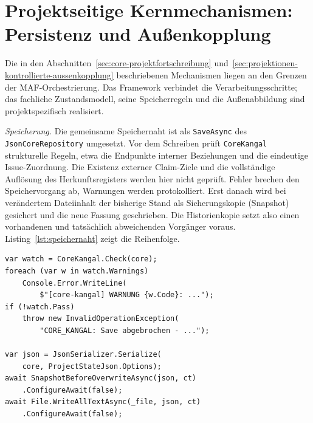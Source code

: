 \section{Projektseitige Kernmechanismen: Persistenz und Außenkopplung}
\label{sec:realisierung-persistenz-aussenkopplung}

Die in den Abschnitten~\ref{sec:core-projektfortschreibung}
und~\ref{sec:projektionen-kontrollierte-aussenkopplung} beschriebenen
Mechanismen liegen an den Grenzen der MAF-Orchestrierung.
Das Framework verbindet die Verarbeitungsschritte; das fachliche
Zustandsmodell, seine Speicherregeln und die Außenabbildung sind
projektspezifisch realisiert.

\emph{Speicherung.} Die gemeinsame Speichernaht ist als
\texttt{SaveAsync} des \texttt{JsonCoreRepository} umgesetzt.
Vor dem Schreiben prüft \texttt{CoreKangal} strukturelle Regeln,
etwa die Endpunkte interner Beziehungen und die eindeutige
Issue-Zuordnung. Die Existenz externer Claim-Ziele und die
vollständige Auflösung des Herkunftsregisters werden hier nicht
geprüft. Fehler brechen den Speichervorgang ab, Warnungen
werden protokolliert. Erst danach wird bei verändertem Dateiinhalt
der bisherige Stand als Sicherungskopie (Snapshot) gesichert und die neue Fassung
geschrieben. Die Historienkopie setzt also einen vorhandenen und
tatsächlich abweichenden Vorgänger voraus.
Listing~\ref{lst:speichernaht} zeigt die Reihenfolge.

\par\noindent
\begin{minipage}{\linewidth}
\lstset{
  language=[Sharp]C,
  basicstyle=\ttfamily,
  columns=fullflexible,
  keepspaces=true,
  showstringspaces=false,
  breaklines=true,
  breakatwhitespace=true
}
\begin{lstlisting}[caption={[Speicherung nach Integritätsprüfung]Speicherung nach Integritätsprüfung
  (Ausschnitt aus \texttt{JsonCoreRepository.cs}).},
  label={lst:speichernaht}]
var watch = CoreKangal.Check(core);
foreach (var w in watch.Warnings)
    Console.Error.WriteLine(
        $"[core-kangal] WARNUNG {w.Code}: ...");
if (!watch.Pass)
    throw new InvalidOperationException(
        "CORE_KANGAL: Save abgebrochen - ...");

var json = JsonSerializer.Serialize(
    core, ProjectStateJson.Options);
await SnapshotBeforeOverwriteAsync(json, ct)
    .ConfigureAwait(false);
await File.WriteAllTextAsync(_file, json, ct)
    .ConfigureAwait(false);
\end{lstlisting}
\end{minipage}
\par\medskip

